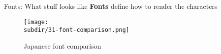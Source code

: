 \documentclass[../index.tex]{subfiles}
\begin{document}
\renewcommand{\currenttitle}{Fonts: What stuff looks like}
\begin{frame}{\currenttitle}
%
%
%
%
%
%
  \textbf{Fonts} define how to render the characters \\[1em]

  \begin{figure}
    \centering
    \texttt{[image: \\subdir/31-font-comparison.png]}
    \caption{Japanese font comparison}
  \end{figure}
\end{frame}
\end{document}
